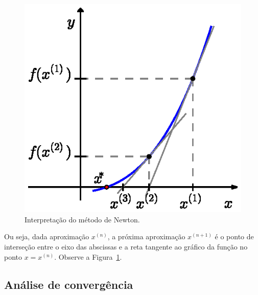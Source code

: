 \begin{ex}
\begin{figure}[h]
  \centering
  \includegraphics{./cap_equacao1d/pics/metodo_de_Newton/metodo_de_Newton.eps}
  \caption{Interpretação do método de Newton.}
  \label{fig:metodo_de_Newton}
\end{figure}

Ou seja, dada aproximação $x^{(n)}$, a próxima aproximação $x^{(n+1)}$ é o ponto de interseção entre o eixo das abscissas e a reta tangente ao gráfico da função no ponto $x = x^{(n)}$. Observe a Figura~\ref{fig:metodo_de_Newton}.

\subsection{Análise de convergência}\label{Analise_conv_Newton}


\end{ex}
